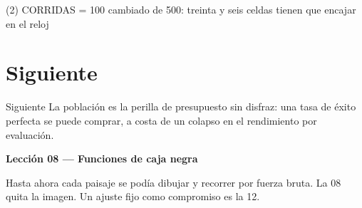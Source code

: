 \begin{frame}[fragile]{(2) CORRIDAS = 100 cambiado de 500: treinta y seis celdas tienen que encajar en el reloj}

\end{frame}


\section{Siguiente}

\begin{frame}{Siguiente}
La población es la perilla de presupuesto sin disfraz: una tasa de éxito perfecta se puede comprar, a costa de un colapso en el rendimiento por evaluación.

\vspace{0.8em}
\textbf{Lección 08 --- Funciones de caja negra}

Hasta ahora cada paisaje se podía dibujar y recorrer por fuerza bruta. La 08 quita la imagen. Un ajuste fijo como compromiso es la 12.
\end{frame}

